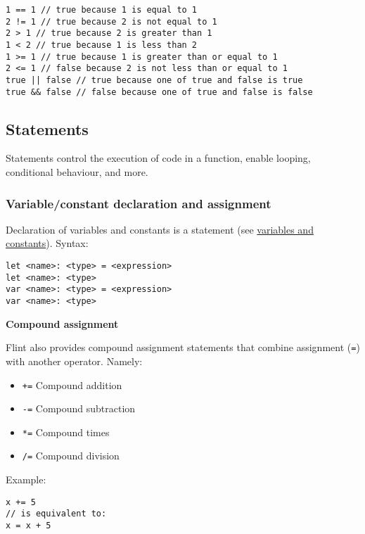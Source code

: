 \begin{verbatim}
1 == 1 // true because 1 is equal to 1
2 != 1 // true because 2 is not equal to 1
2 > 1 // true because 2 is greater than 1
1 < 2 // true because 1 is less than 2
1 >= 1 // true because 1 is greater than or equal to 1
2 <= 1 // false because 2 is not less than or equal to 1
true || false // true because one of true and false is true
true && false // false because one of true and false is false
\end{verbatim}

\subsection{Statements}
\label{sec:appendix-b-statements}

Statements control the execution of code in a function, enable looping, conditional behaviour, and more.

\subsubsection{Variable/constant declaration and assignment}
\label{sec:appendix-b-variableconstant-declaration-and-assignment}

Declaration of variables and constants is a statement (see \hyperref[sec:appendix-b-constants-and-variables]{variables and constants}). Syntax:

\begin{verbatim}
let <name>: <type> = <expression>
let <name>: <type>
var <name>: <type> = <expression>
var <name>: <type>
\end{verbatim}

\textbf{Compound assignment}
\label{sec:appendix-b-compound-assignment}

Flint also provides compound assignment statements that combine assignment (\texttt{=}) with another operator. Namely:

\begin{itemize}
	\item \texttt{+=} Compound addition
	\item \texttt{-=} Compound subtraction
	\item \texttt{*=} Compound times
	\item \texttt{/=} Compound division
\end{itemize}

Example:

\begin{verbatim}
x += 5
// is equivalent to:
x = x + 5
\end{verbatim}

